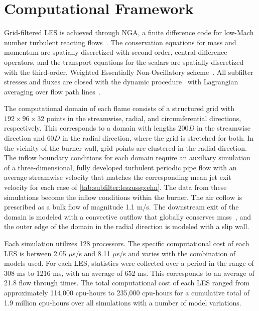 \section{Computational Framework}
\label{sec:lesresults:comput}

Grid-filtered LES is achieved through NGA, a finite difference code for low-Mach number turbulent reacting flows~\cite{desjardins2008}. The conservation equations for mass and momentum are spatially discretized with second-order, central difference operators, and the transport equations for the scalars are spatially discretized with the third-order, Weighted Essentially Non-Oscillatory scheme~\cite{jiang1996}. All subfilter stresses and fluxes are closed with the dynamic procedure~\cite{germano1991,lilly1992,moin1991} with Lagrangian averaging over flow path lines~\cite{meneveau1996,reveillon1996}.

The computational domain of each flame consists of a structured grid with $192 \times 96 \times 32$ points in the streamwise, radial, and circumferential directions, respectively. This corresponds to a domain with lengths $200D$ in the streamwise direction and $60D$ in the radial direction, where the grid is stretched for both. In the vicinity of the burner wall, grid points are clustered in the radial direction. The inflow boundary conditions for each domain require an auxiliary simulation of a three-dimensional, fully developed turbulent periodic pipe flow with an average streamwise velocity that matches the corresponding mean jet exit velocity for each case of \cref{tab:subfilter:leszussp:ehn}. The data from these simulations become the inflow conditions within the burner. The air coflow is prescribed as a bulk flow of magnitude 1.1 m/s. The downstream exit of the domain is modeled with a convective outflow that globally conserves mass~\cite{akselvoll1996}, and the outer edge of the domain in the radial direction is modeled with a slip wall.

Each simulation utilizes 128 processors. The specific computational cost of each LES is between 2.05 $\mu$s/s and 8.11 $\mu$s/s and varies with the combination of models used. For each LES, statistics were collected over a period in the range of 308 ms to 1216 ms, with an average of 652 ms. This corresponds to an average of 21.8 flow through times. The total computational cost of each LES ranged from approximately 114,000 cpu-hours to 235,000 cpu-hours for a cumulative total of 1.9 million cpu-hours over all simulations with a number of model variations. %

